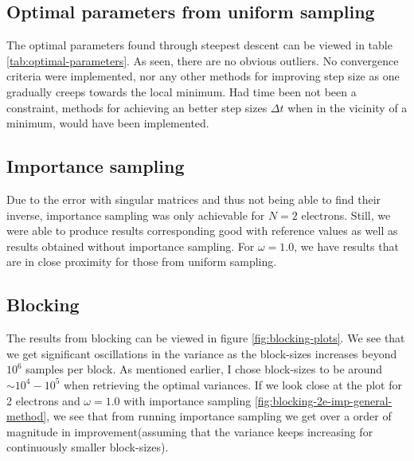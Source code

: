 \documentclass[11pt]{article}
\newcommand{\husk}[1]{\color{red} #1 \color{black}}
\begin{document}
\subsection{Optimal parameters from uniform sampling}
The optimal parameters found through steepest descent can be viewed in table \ref{tab:optimal-parameters}. As seen, there are no obvious outliers. No convergence criteria were implemented, nor any other methods for improving step size as one gradually creeps towards the local minimum. Had time been not been a constraint, methods for achieving an better step sizes $\Delta t$ when in the vicinity of a minimum, would have been implemented.

\subsection{Importance sampling}
Due to the error with singular matrices and thus not being able to find their inverse, importance sampling was only achievable for $N=2$ electrons. Still, we were able to produce results corresponding good with reference values as well as results obtained without importance sampling. For $\omega = 1.0$, we have results that are in close proximity for those from uniform sampling.

\subsection{Blocking}
The results from blocking can be viewed in figure \ref{fig:blocking-plots}. We see that we get significant oscillations in the variance as the block-sizes increases beyond $10^6$ samples per block. As mentioned earlier, I chose block-sizes to be around $\sim 10^4-10^5$ when retrieving the optimal variances. If we look close at the plot for 2 electrons and $\omega = 1.0$ with importance sampling \ref{fig:blocking-2e-imp-general-method}, we see that from running importance sampling we get over a order of magnitude in improvement(assuming that the variance keeps increasing for continuously smaller block-sizes).
\end{document}
